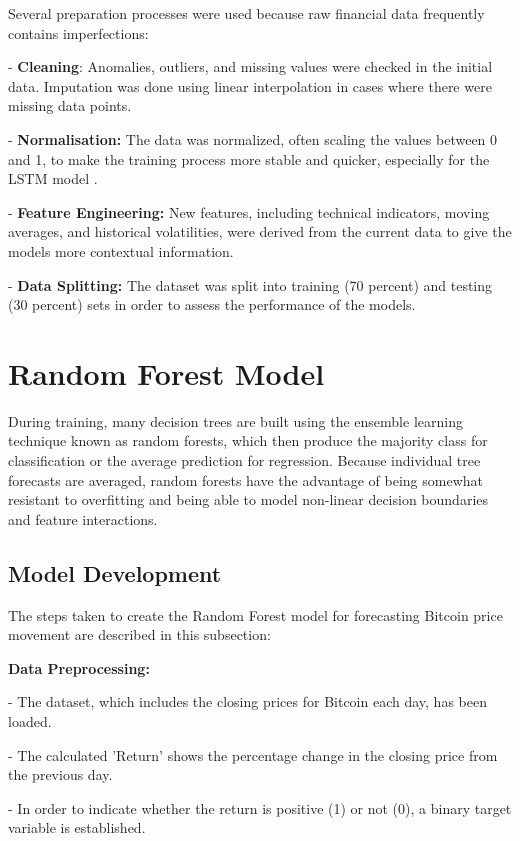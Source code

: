 Several preparation processes were used because raw financial data frequently contains imperfections:

-	\textbf{Cleaning}: Anomalies, outliers, and missing values were checked in the initial data. 
Imputation was done using linear interpolation in cases where there were missing data points.

-	\textbf{Normalisation:} The data was normalized, often scaling the values between 0 and 1, to make the training process more stable and quicker, especially for the LSTM model \citep{Goodfellow-et-al-2016}.

-	\textbf{Feature Engineering:} New features, including technical indicators, moving averages, and historical volatilities, were derived from the current data to give the models more contextual information.

-	\textbf{Data Splitting:} The dataset was split into training (70 percent) and testing (30 percent) sets in order to assess the performance of the models.

\goodbreak

\section{Random Forest Model}

During training, many decision trees are built using the ensemble learning technique known as random forests, which then produce the majority class for classification or the average prediction for regression. Because individual tree forecasts are averaged, random forests have the advantage of being somewhat resistant to overfitting and being able to model non-linear decision boundaries and feature interactions.

\subsection{Model Development}

The steps taken to create the Random Forest model for forecasting Bitcoin price movement are described in this subsection:

\textbf{Data Preprocessing:}

-	The dataset, which includes the closing prices for Bitcoin each day, has been loaded.

-	The calculated 'Return' shows the percentage change in the closing price from the previous day.

-	In order to indicate whether the return is positive (1) or not (0), a binary target variable is established.

